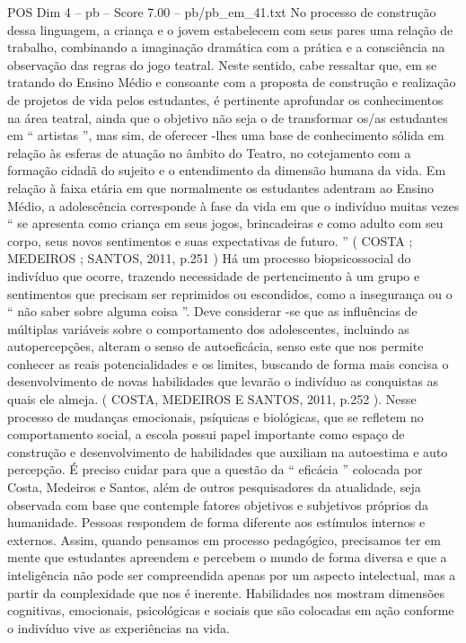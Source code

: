 \begin{textsample}{POS Dim 4 – pb – Score 7.00 – pb/pb\_em\_41.txt}
No processo de construção dessa linguagem, a criança e o jovem estabelecem com seus pares uma relação de trabalho, combinando a imaginação dramática com a prática e a consciência na observação das regras do jogo teatral.
Neste sentido, cabe ressaltar que, em se tratando do Ensino Médio e consoante com a proposta de construção e realização de projetos de vida pelos estudantes, é pertinente aprofundar os conhecimentos na área teatral, ainda que o objetivo não seja o de transformar os/as estudantes em “ artistas ”, mas sim, de oferecer -lhes uma base de conhecimento sólida em relação às esferas de atuação no âmbito do Teatro, no cotejamento com a formação cidadã do sujeito e o entendimento da dimensão humana da vida.
Em relação à faixa etária em que normalmente os estudantes adentram ao Ensino Médio, a adolescência corresponde à fase da vida em que o indivíduo muitas vezes “ se apresenta como criança em seus jogos, brincadeiras e como adulto com seu corpo, seus novos sentimentos e suas expectativas de futuro. ” ( COSTA ; MEDEIROS ; SANTOS, 2011, p.251 ) Há um processo biopsicossocial do indivíduo que ocorre, trazendo necessidade de pertencimento à um grupo e sentimentos que precisam ser reprimidos ou escondidos, como a insegurança ou o “ não saber sobre alguma coisa ”.
Deve considerar -se que as influências de múltiplas variáveis sobre o comportamento dos adolescentes, incluindo as autopercepções, alteram o senso de autoeficácia, senso este que nos permite conhecer as reais potencialidades e os limites, buscando de forma mais concisa o desenvolvimento de novas habilidades que levarão o indivíduo as conquistas as quais ele almeja. ( COSTA, MEDEIROS E SANTOS, 2011, p.252 ).
Nesse processo de mudanças emocionais, psíquicas e biológicas, que se refletem no comportamento social, a escola possui papel importante como espaço de construção e desenvolvimento de habilidades que auxiliam na autoestima e auto percepção.
É preciso cuidar para que a questão da “ eficácia ” colocada por Costa, Medeiros e Santos, além de outros pesquisadores da atualidade, seja observada com base que contemple fatores objetivos e subjetivos próprios da humanidade.
Pessoas respondem de forma diferente aos estímulos internos e externos.
Assim, quando pensamos em processo pedagógico, precisamos ter em mente que estudantes apreendem e percebem o mundo de forma diversa e que a inteligência não pode ser compreendida apenas por um aspecto intelectual, mas a partir da complexidade que nos é inerente.
Habilidades nos mostram dimensões cognitivas, emocionais, psicológicas e sociais que são colocadas em ação conforme o indivíduo vive as experiências na vida.

\end{textsample}
